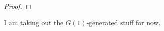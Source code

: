 \documentclass{amsbook} %
\numberwithin{section}{chapter}
\begin{document}
\begin{proof}
\end{proof}

I am taking out the $G(1)$-generated stuff for now.
\end{document}
